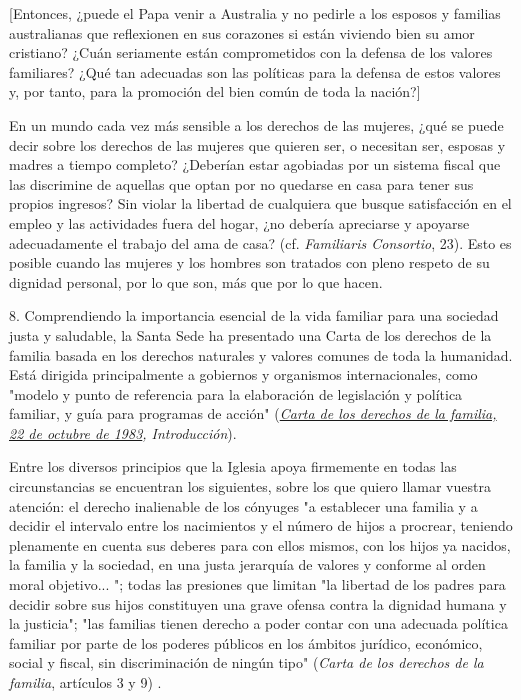 {[}Entonces, ¿puede el Papa venir a Australia y no pedirle a los esposos
y familias australianas que reflexionen en sus corazones si están
viviendo bien su amor cristiano? ¿Cuán seriamente están comprometidos
con la defensa de los valores familiares? ¿Qué tan adecuadas son las
políticas para la defensa de estos valores y, por tanto, para la
promoción del bien común de toda la nación?{]}

En un mundo cada vez más sensible a los derechos de las mujeres, ¿qué se
puede decir sobre los derechos de las mujeres que quieren ser, o
necesitan ser, esposas y madres a tiempo completo? ¿Deberían estar
agobiadas por un sistema fiscal que las discrimine de aquellas que optan
por no quedarse en casa para tener sus propios ingresos? Sin violar la
libertad de cualquiera que busque satisfacción en el empleo y las
actividades fuera del hogar, ¿no debería apreciarse y apoyarse
adecuadamente el trabajo del ama de casa? (cf. \emph{Familiaris
	Consortio}, 23). Esto es posible cuando las mujeres y los hombres son
tratados con pleno respeto de su dignidad personal, por lo que son, más
que por lo que hacen.

8. Comprendiendo la importancia esencial de la vida familiar para una
sociedad justa y saludable, la Santa Sede ha presentado una Carta de los
derechos de la familia basada en los derechos naturales y valores
comunes de toda la humanidad. Está dirigida principalmente a gobiernos y
organismos internacionales, como "modelo y punto de referencia para la
elaboración de legislación y política familiar, y guía para programas de
acción"
(\emph{\emph{\href{http://www.vatican.va/roman_curia/pontifical_councils/family/documents/rc_pc_family_doc_19831022_family-rights_it.html}{Carta
			de los derechos de la familia, 22 de octubre de 1983}, Introducción}}).

Entre los diversos principios que la Iglesia apoya firmemente en todas
las circunstancias se encuentran los siguientes, sobre los que quiero
llamar vuestra atención: el derecho inalienable de los cónyuges "a
establecer una familia y a decidir el intervalo entre los nacimientos y
el número de hijos a procrear, teniendo plenamente en cuenta sus deberes
para con ellos mismos, con los hijos ya nacidos, la familia y la
sociedad, en una justa jerarquía de valores y conforme al orden moral
objetivo... "; todas las presiones que limitan "la libertad de los
padres para decidir sobre sus hijos constituyen una grave ofensa contra
la dignidad humana y la justicia"; "las familias tienen derecho a poder
contar con una adecuada política familiar por parte de los poderes
públicos en los ámbitos jurídico, económico, social y fiscal, sin
discriminación de ningún tipo" (\emph{Carta de los derechos de la
	familia}, artículos 3 y 9) .


